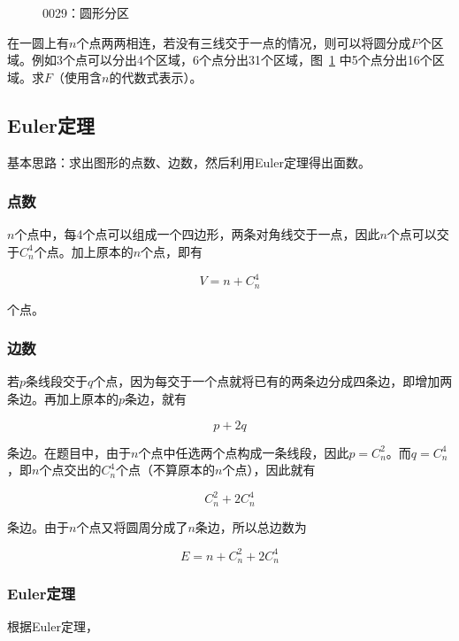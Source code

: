 

\begin{figure}[htbp]
  \centering
  \caption{0029：圆形分区} \label{fig:0029}
\end{figure}

在一圆上有$n$个点两两相连，若没有三线交于一点的情况，则可以将圆分成$F$个区域。例如3个点可以分出4个区域，6个点分出31个区域，图~\ref{fig:0029} 中5个点分出16个区域。求$F$（使用含$n$的代数式表示）。


\subsection{Euler定理}

基本思路：求出图形的点数、边数，然后利用Euler定理得出面数。

\subsubsection{点数}

$n$个点中，每4个点可以组成一个四边形，两条对角线交于一点，因此$n$个点可以交于$C_n^4$个点。加上原本的$n$个点，即有

\[ V = n + C_n^4 \]

\noindent 个点。

\subsubsection{边数}

若$p$条线段交于$q$个点，因为每交于一个点就将已有的两条边分成四条边，即增加两条边。再加上原本的$p$条边，就有

\[ p + 2q \]

\noindent 条边。在题目中，由于$n$个点中任选两个点构成一条线段，因此$p = C_n^2$。而$q = C_n^4$，即$n$个点交出的$C_n^4$个点（不算原本的$n$个点），因此就有

\[ C_n^2 + 2C_n^4 \]

\noindent 条边。由于$n$个点又将圆周分成了$n$条边，所以总边数为

\[ E = n + C_n^2 + 2C_n^4 \]

\subsubsection{Euler定理}

根据Euler定理，

